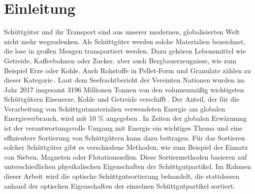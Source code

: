\chapter{Einleitung}


Schüttgüter und ihr Transport sind aus unserer modernen, globalisierten Welt nicht mehr wegzudenken.
Als Schüttgüter werden solche Materialien bezeichnet, die lose in großen Mengen transportiert werden. 
Dazu gehören Lebensmittel wie Getreide, Kaffeebohnen oder Zucker, aber auch Bergbauerzeugnisse, wie zum Beispiel Erze oder Kohle. 
Auch Rohstoffe in Pellet-Form und Granulate zählen zu dieser Kategorie\,\cite[]{schulze2009}.
Laut dem Seefrachtbericht der Vereinten Nationen wurden im Jahr 2017 insgesamt 3196 Millionen Tonnen von den volumenmäßig wichtigsten Schüttgütern Eisenerze, Kohle und Getreide verschifft\,\cite[Unterabschnitt 1.A.2]{unitednationsconferenceontradeanddevelopment2018}.
Der Anteil, der für die Verarbeitung von Schüttgutmaterialien verwendeten Energie am globalen Energieverbrauch, wird mit 10 \% angegeben\,\cite[Abschnitt 1.2]{duran2012sands}.
In Zeiten der globalen Erwärmung ist der verantwortungsvolle Umgang mit Energie ein wichtiges Thema 
und eine effizientere Sortierung von Schüttgütern kann dazu beitragen.
Für das Sortieren solcher Schüttgüter gibt es verschiedene Methoden, 
wie zum Beispiel der Einsatz von Sieben, Magneten oder Flotationszellen.
Diese Sortiermethoden basieren auf unterschiedlichen physikalischen Eigenschaften der Schüttgutpartikel.
Im Rahmen dieser Arbeit wird die optische Schüttgutsortierung behandelt, 
die stattdessen anhand der optischen Eigenschaften der einzelnen Schüttgutpartikel sortiert.
